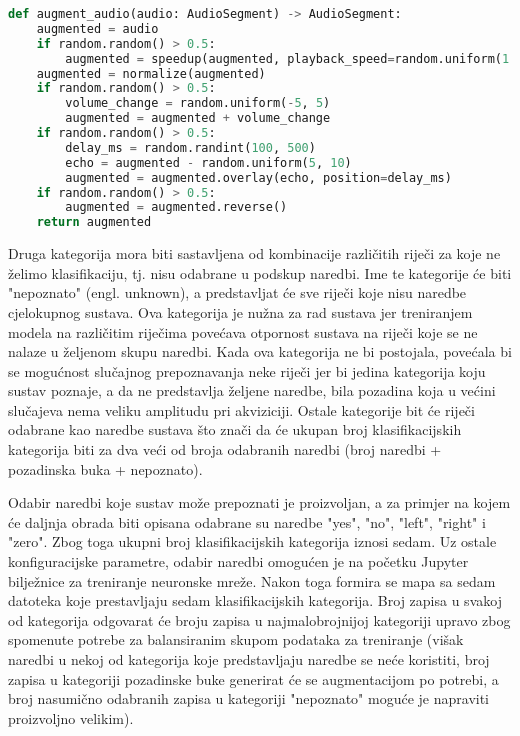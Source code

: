 \begin{lstlisting}[language=Python, caption=Augmentacija zvuka, label=code:augmentation]
def augment_audio(audio: AudioSegment) -> AudioSegment:
    augmented = audio
    if random.random() > 0.5:
        augmented = speedup(augmented, playback_speed=random.uniform(1.1, 1.5))
    augmented = normalize(augmented)
    if random.random() > 0.5:
        volume_change = random.uniform(-5, 5) 
        augmented = augmented + volume_change
    if random.random() > 0.5:
        delay_ms = random.randint(100, 500) 
        echo = augmented - random.uniform(5, 10) 
        augmented = augmented.overlay(echo, position=delay_ms)
    if random.random() > 0.5:
        augmented = augmented.reverse()
    return augmented
\end{lstlisting}


Druga kategorija mora biti sastavljena od kombinacije različitih riječi za koje
ne želimo klasifikaciju, tj. nisu odabrane u podskup naredbi. Ime te kategorije
će biti "nepoznato" (engl. unknown), a predstavljat će sve riječi koje nisu
naredbe cjelokupnog sustava. Ova kategorija je nužna za rad sustava jer 
treniranjem modela na različitim riječima povećava otpornost sustava na riječi
koje se ne nalaze u željenom skupu naredbi. Kada ova kategorija ne bi postojala,
povećala bi se mogućnost slučajnog prepoznavanja neke riječi jer bi jedina kategorija
koju sustav poznaje, a da ne predstavlja željene naredbe, bila pozadina koja
u većini slučajeva nema veliku amplitudu pri akviziciji. 
Ostale kategorije bit će riječi odabrane kao naredbe
sustava što  znači da će ukupan broj klasifikacijskih kategorija biti za dva veći 
od broja odabranih naredbi (broj naredbi + pozadinska buka + nepoznato).

Odabir naredbi koje sustav može prepoznati je proizvoljan, a za primjer na kojem
će daljnja obrada biti opisana odabrane su naredbe "yes", "no", "left", "right" i 
"zero". Zbog toga ukupni broj
klasifikacijskih kategorija iznosi sedam. Uz ostale konfiguracijske parametre,
odabir naredbi omogućen je na početku Jupyter bilježnice za treniranje neuronske mreže.
Nakon toga formira se mapa sa sedam datoteka koje prestavljaju sedam klasifikacijskih
kategorija.
Broj zapisa u svakoj od kategorija odgovarat će broju zapisa u najmalobrojnijoj 
kategoriji upravo zbog spomenute potrebe za balansiranim skupom podataka za treniranje
(višak naredbi u nekoj od kategorija koje predstavljaju naredbe se neće koristiti, broj
zapisa u kategoriji pozadinske buke generirat će se augmentacijom po potrebi, a broj
nasumično odabranih zapisa u kategoriji "nepoznato" moguće je napraviti proizvoljno
velikim).

